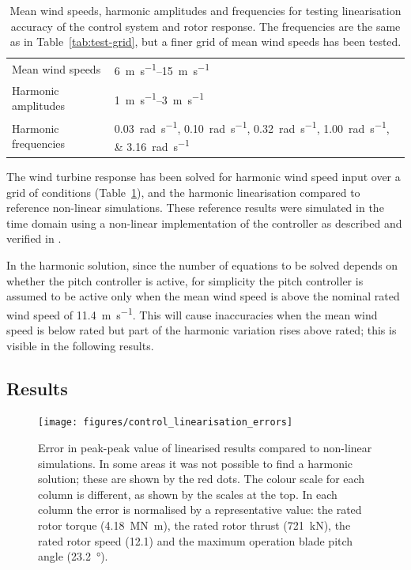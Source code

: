 \documentclass[preprint]{elsarticle}
\begin{document}
\begin{table}
  \centering
  \caption{Mean wind speeds, harmonic amplitudes and frequencies for testing
    linearisation accuracy of the control system and rotor response. The
    frequencies are the same as in Table~\ref{tab:test-grid}, but a finer grid
    of mean wind speeds has been tested.}
  \label{tab:test-grid-2}
  \begin{tabular}{ll}
    \toprule
    Mean wind speeds & \SIrange{6}{15}{\meter\per\second} \\
    Harmonic amplitudes & \SIrange{1}{3}{\meter\per\second} \\
    Harmonic frequencies & \SIlist{0.03;0.10;0.32;1.00;3.16}{\radian\per\second} \\
    \bottomrule
  \end{tabular}
\end{table}

The wind turbine response has been solved for harmonic wind speed input over a
grid of conditions (Table~\ref{tab:test-grid-2}), and the harmonic linearisation
compared to reference non-linear simulations. These reference results were
simulated in the time domain using a non-linear implementation of the controller
as described and verified in \citet{lupton_frequencydomain_2015}.

In the harmonic solution, since the number of equations to be solved depends on
whether the pitch controller is active, for simplicity the pitch controller is
assumed to be active only when the mean wind speed is above the nominal rated
wind speed of \SI{11.4}{\metre\per\second}. This will cause inaccuracies when
the mean wind speed is below rated but part of the harmonic variation rises
above rated; this is visible in the following results.

\subsection{Results}
\label{sec:control-results}

\begin{figure}
  \centering
  \hspace*{-0.5cm}\texttt{[image: figures/control\_linearisation\_errors]}
  \caption{Error in peak-peak value of linearised results compared to
    non-linear simulations. In some areas it was not possible to find a
    harmonic solution; these are shown by the red dots. The colour
    scale for each column is different, as shown by the scales at the
    top. In each column the error is normalised by a representative
    value: the rated rotor torque (\SI{4.18}{\mega\newton\metre}), the
    rated rotor thrust (\SI{721}{\kilo\newton}), the rated rotor speed
    (\SI{12.1}{\rpm}) and the maximum operation blade pitch angle
    (\SI{23.2}{\degree}).}
  \label{fig:control-lin-errors}
\end{figure}
\end{document}
